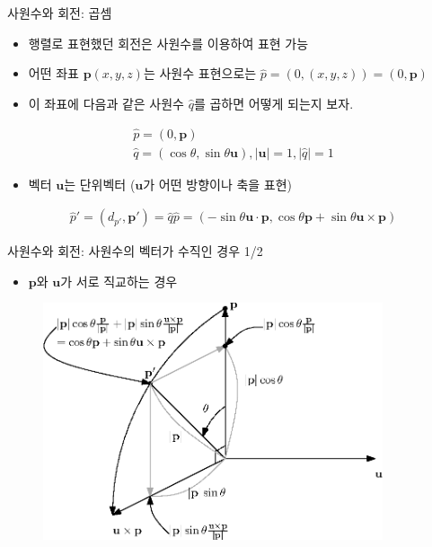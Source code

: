 \begin{frame}[fragile]{사원수와 회전: 곱셈}

\begin{itemize}
\item 행렬로 표현했던 회전은 사원수를 이용하여 표현 가능
\item 어떤 좌표 ${\mathbf p}(x,y,z)$는 사원수 표현으로는 $\hat p=(0, (x,y,z))=(0, \mathbf p)$
\item 이 좌표에 다음과 같은 사원수 $\hat q$를 곱하면 어떻게 되는지 보자.
\end{itemize}

\begin{eqnarray}\nonumber
\hat p = (0, \mathbf p) \\ \nonumber
\hat q = (\cos \theta, \sin \theta \mathbf u), |\mathbf u| = 1, |\hat q| = 1 \nonumber
\end{eqnarray}

\begin{itemize}
\item 벡터 $\mathbf u$는 단위벡터 ($\mathbf u$가 어떤 방향이나 축을 표현)
\end{itemize}

\begin{eqnarray}\nonumber
\hat p' = (d_{p'}, \mathbf p') = \hat q \hat p =  (-\sin \theta \mathbf u \cdot \mathbf p , \cos \theta \mathbf p + \sin \theta \mathbf u \times \mathbf p) \nonumber
\end{eqnarray}

\end{frame}

\begin{frame}[fragile]{사원수와 회전: 사원수의 벡터가 수직인 경우 1/2}

\begin{itemize}
\item $\mathbf p$와 $\mathbf u$가 서로 직교하는 경우
\end{itemize}

\begin{figure}
    \includegraphics[width=10cm]{Math_quaternion/quaternionOrtho.eps}
\end{figure}

\end{frame}

